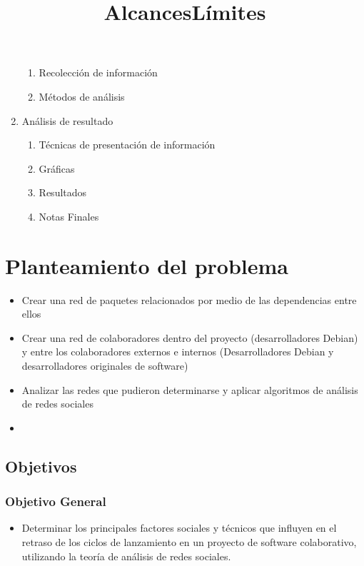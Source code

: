 \documentclass[12pt]{report}
\begin{document}
\begin{enumerate}
\begin{enumerate}
  \item Recolección de información
  \item Métodos de análisis
  \end{enumerate}
\item Análisis de resultado
  \begin{enumerate}
  \item Técnicas de presentación de información
  \item Gráficas
  \item Resultados
  \item Notas Finales
  \end{enumerate}
\end{enumerate}

\chapter*{Planteamiento del problema}
\title{Alcances} 
\begin{itemize}
\item Crear una red de paquetes relacionados por medio de las dependencias
entre ellos
\item Crear una red de colaboradores dentro del proyecto (desarrolladores Debian) y entre los colaboradores
externos e internos (Desarrolladores Debian y desarrolladores originales de software)
\item Analizar las redes que pudieron determinarse y aplicar algoritmos de análisis de redes sociales
\end{itemize}
\title{Límites}
\begin{itemize}
\item 
\end{itemize}


\section*{Objetivos}  %
\subsection*{Objetivo General}
\begin{itemize}
\item  Determinar los  principales  factores sociales  y técnicos  que
influyen en el retraso de los  ciclos de lanzamiento en un proyecto de
software  colaborativo,  utilizando la  teoría  de  análisis de  redes
sociales.
\end{itemize}
\end{document}

